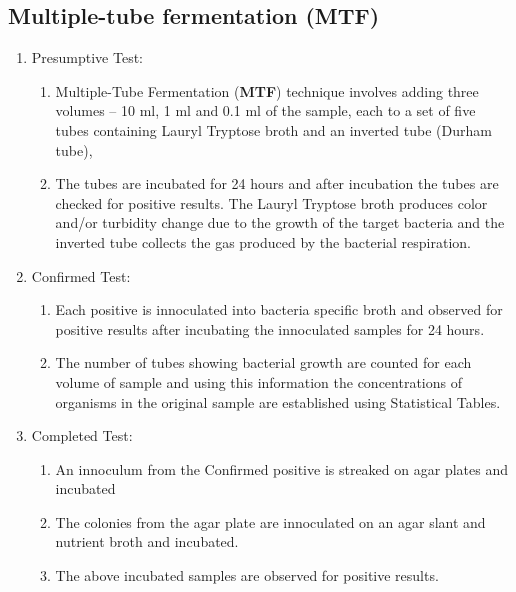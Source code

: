 \subsection{Multiple-tube fermentation (MTF)}
\begin{enumerate}[label={\bfseries Stage \arabic*}]
\item Presumptive Test:
\begin{enumerate}[Step 1.]
\item Multiple-Tube Fermentation (\textbf{MTF}) technique involves adding three volumes – 10 ml, 1 ml and 0.1 ml of the sample, each to a set of five tubes containing Lauryl Tryptose broth and an inverted tube (Durham tube), 
\item The tubes are incubated for 24 hours and after incubation the tubes are checked for positive results.  The Lauryl Tryptose broth produces color and/or turbidity change due to the growth of the target bacteria and the inverted tube collects the gas produced by the bacterial respiration.  
\end{enumerate}
\item Confirmed Test:
\begin{enumerate}[Step 1.]
\item Each positive is innoculated into bacteria specific broth and observed for positive results after incubating the innoculated samples for 24 hours.
\item The number of tubes showing bacterial growth are counted for each volume of sample and using this information the concentrations of organisms in the original sample are established using Statistical Tables.
\end{enumerate}
\item Completed Test:
\begin{enumerate}[Step 1.]
\item An innoculum from the Confirmed positive is streaked on agar plates and incubated
\item The colonies from the agar plate are innoculated on an agar slant and nutrient broth and incubated.
\item The above incubated samples are observed for positive results.
\end{enumerate}
\end{enumerate}
%
